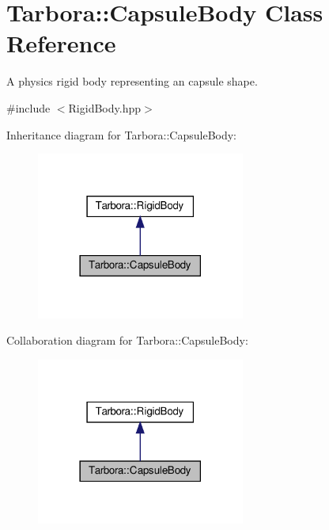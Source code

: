 \hypertarget{classTarbora_1_1CapsuleBody}{}\section{Tarbora\+:\+:Capsule\+Body Class Reference}
\label{classTarbora_1_1CapsuleBody}


A physics rigid body representing an capsule shape.  




{\ttfamily \#include $<$Rigid\+Body.\+hpp$>$}



Inheritance diagram for Tarbora\+:\+:Capsule\+Body\+:\nopagebreak
\begin{figure}[H]
\begin{center}
\leavevmode
\includegraphics[width=194pt]{classTarbora_1_1CapsuleBody__inherit__graph}
\end{center}
\end{figure}


Collaboration diagram for Tarbora\+:\+:Capsule\+Body\+:\nopagebreak
\begin{figure}[H]
\begin{center}
\leavevmode
\includegraphics[width=194pt]{classTarbora_1_1CapsuleBody__coll__graph}
\end{center}
\end{figure}
